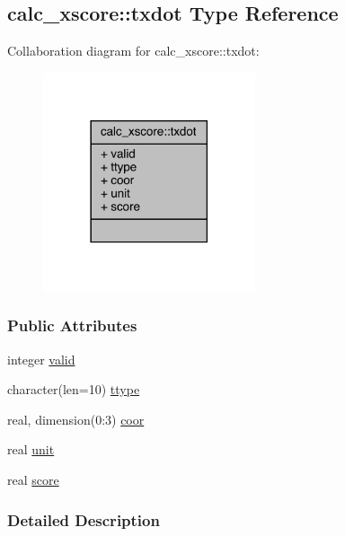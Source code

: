 \hypertarget{structcalc__xscore_1_1txdot}{\subsection{calc\-\_\-xscore\-:\-:txdot Type Reference}
\label{structcalc__xscore_1_1txdot}
}


Collaboration diagram for calc\-\_\-xscore\-:\-:txdot\-:
\nopagebreak
\begin{figure}[H]
\begin{center}
\leavevmode
\includegraphics[width=177pt]{structcalc__xscore_1_1txdot__coll__graph}
\end{center}
\end{figure}
\subsubsection*{Public Attributes}
\begin{DoxyCompactItemize}
\item 
integer \hyperlink{structcalc__xscore_1_1txdot_a34c5c77921f059525edad9a1ff90b537}{valid}
\item 
character(len=10) \hyperlink{structcalc__xscore_1_1txdot_a81545718f5265361d6e7bffebfc1ada7}{ttype}
\item 
real, dimension(0\-:3) \hyperlink{structcalc__xscore_1_1txdot_a95e430e8a8bdfdb589d35eea59fa8275}{coor}
\item 
real \hyperlink{structcalc__xscore_1_1txdot_acf6c61fd8f3ee95d0c7a507530da4ce1}{unit}
\item 
real \hyperlink{structcalc__xscore_1_1txdot_ad8f8740d2b25f6f1e31b78a5ddf7072e}{score}
\end{DoxyCompactItemize}


\subsubsection{Detailed Description}



